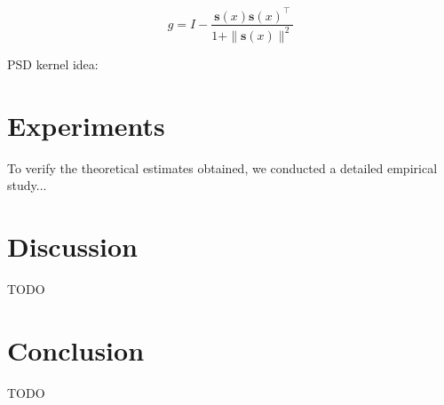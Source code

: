 \documentclass{article}
\begin{document}
\[
g = I - \frac{\mathbf{s}(x)\mathbf{s}(x)^\top}{1 + \|\mathbf{s}(x)\|^2}
\]

PSD kernel idea:



\section{Experiments}\label{sec:exp}

To verify the theoretical estimates obtained, we conducted a detailed empirical study...

\section{Discussion}\label{sec:disc}

TODO

\section{Conclusion}\label{sec:concl}

TODO


\end{document}
